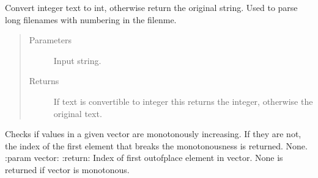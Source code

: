 \documentclass[letterpaper,10pt,english]{sphinxmanual}
\begin{document}
\begin{fulllineitems}
\label{\detokenize{autodocs/misc:listmode.misc.atoi}}
\sphinxAtStartPar
Convert integer text to int, otherwise return the original string. Used to parse long filenames with numbering
in the filenme.
\begin{quote}\begin{description}
\item[{Parameters}] \leavevmode
\sphinxAtStartPar
{} \textendash{} Input string.

\item[{Returns}] \leavevmode
\sphinxAtStartPar
If text is convertible to integer this returns the integer, otherwise the original text.

\end{description}\end{quote}

\end{fulllineitems}


\begin{fulllineitems}
\label{\detokenize{autodocs/misc:listmode.misc.check_monotonousness}}
\sphinxAtStartPar
Checks if values in a given vector are monotonously increasing. If they are not, the index of the first element
that breaks the monotonousness is returned. None.
:param vector:
:return: Index of first out\sphinxhyphen{}of\sphinxhyphen{}place element in vector. None is returned if vector is monotonous.

\end{fulllineitems}

\end{document}
